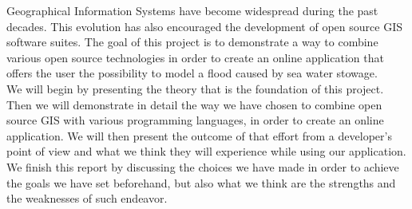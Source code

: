 Geographical Information Systems have become widespread during the past decades. This evolution has also encouraged the development of open source GIS software suites. The goal of this project is to demonstrate a way to combine various open source technologies in order to create an online application that offers the user the possibility to model a flood caused by sea water stowage.\\

We will begin by presenting the theory that is the foundation of this project. Then we will demonstrate in detail the way we have chosen to combine open source GIS with various programming languages, in order to create an online application. We will then present the outcome of that effort from a developer's point of view and what we think they will experience while using our application. We finish this report by discussing the choices we have made in order to achieve the goals we have set beforehand, but also what we think are the strengths and the weaknesses of such endeavor.  